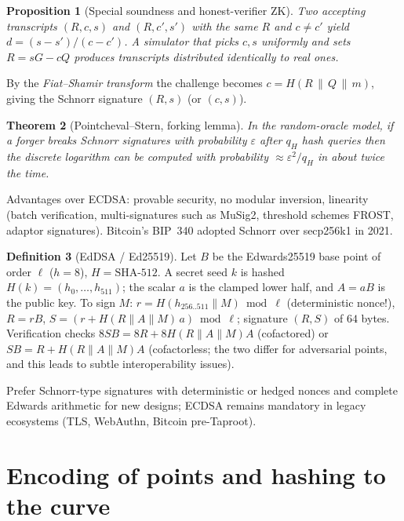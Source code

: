 \documentclass[11pt,a4paper,oneside]{book}
\theoremstyle{plain}
\newtheorem{theorem}{Theorem}[chapter]
\newtheorem{proposition}[theorem]{Proposition}
\theoremstyle{definition}
\newtheorem{definition}[theorem]{Definition}
\theoremstyle{remark}
\begin{document}
\begin{proposition}[Special soundness and honest-verifier ZK]
Two accepting transcripts $(R,c,s)$ and $(R,c',s')$ with the same $R$ and $c\neq c'$ yield $d=(s-s')/(c-c')$. A simulator that picks $c,s$ uniformly and sets $R=sG-cQ$ produces transcripts distributed identically to real ones.
\end{proposition}

By the \emph{Fiat--Shamir transform} the challenge becomes $c=H(R\,\|\,Q\,\|\,m)$, giving the Schnorr signature $(R,s)$ (or $(c,s)$).

\begin{theorem}[Pointcheval--Stern, forking lemma]
In the random-oracle model, if a forger breaks Schnorr signatures with probability $\varepsilon$ after $q_H$ hash queries then the discrete logarithm can be computed with probability $\approx\varepsilon^2/q_H$ in about twice the time.
\end{theorem}

Advantages over ECDSA: provable security, no modular inversion, linearity (batch verification, multi-signatures such as MuSig2, threshold schemes FROST, adaptor signatures). Bitcoin's BIP~340 adopted Schnorr over secp256k1 in 2021.

\begin{definition}[EdDSA / Ed25519]
Let $B$ be the Edwards25519 base point of order $\ell$ ($h=8$), $H=\mathrm{SHA\text{-}512}$. A secret seed $k$ is hashed $H(k)=(h_0,\dots,h_{511})$; the scalar $a$ is the clamped lower half, and $A=aB$ is the public key. To sign $M$: $r=H(h_{256..511}\|M)\bmod\ell$ (deterministic nonce!), $R=rB$, $S=(r+H(R\|A\|M)\,a)\bmod\ell$; signature $(R,S)$ of $64$ bytes. Verification checks $8SB=8R+8H(R\|A\|M)A$ (cofactored) or $SB=R+H(R\|A\|M)A$ (cofactorless; the two differ for adversarial points, and this leads to subtle interoperability issues).
\end{definition}

\begin{keyidea}
Prefer Schnorr-type signatures with deterministic or hedged nonces and complete Edwards arithmetic for new designs; ECDSA remains mandatory in legacy ecosystems (TLS, WebAuthn, Bitcoin pre-Taproot).
\end{keyidea}

\section{Encoding of points and hashing to the curve}
\end{document}
